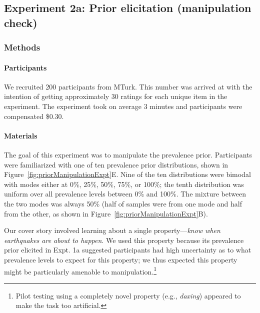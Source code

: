 \documentclass[floatsintext,doc]{apa6}
\let\oldparagraph\paragraph
\renewcommand{\paragraph}[1]{\oldparagraph{#1}\mbox{}}
\let\rmarkdownfootnote\footnote%
\def\footnote{\protect\rmarkdownfootnote}
\begin{document}
\hypertarget{experiment-2a-prior-elicitation-manipulation-check}{%
\subsection{Experiment 2a: Prior elicitation (manipulation check)}\label{experiment-2a-prior-elicitation-manipulation-check}}

\hypertarget{methods-2}{%
\subsubsection{Methods}\label{methods-2}}

\hypertarget{participants-3}{%
\paragraph{Participants}\label{participants-3}}

We recruited 200 participants from MTurk.
This number was arrived at with the intention of getting approximately 30 ratings for each unique item in the experiment.
The experiment took on average 3 minutes and participants were compensated \$0.30.

\hypertarget{materials-1}{%
\paragraph{Materials}\label{materials-1}}

The goal of this experiment was to manipulate the prevalence prior.
Participants were familiarized with one of ten prevalence prior distributions, shown in Figure~\ref{fig:priorManipulationExpt}E.
Nine of the ten distributions were bimodal with modes either at 0\%, 25\%, 50\%, 75\%, or 100\%; the tenth distribution was uniform over all prevalence levels between 0\% and 100\%.
The mixture between the two modes was always 50\% (half of samples were from one mode and half from the other, as shown in Figure~\ref{fig:priorManipulationExpt}B).

Our cover story involved learning about a single property---\emph{know when earthquakes are about to happen}.
We used this property because its prevalence prior elicited in Expt. 1a suggested participants had high uncertainty as to what prevalence levels to expect for this property; we thus expected this property might be particularly amenable to manipulation.\footnote{Pilot testing using a completely novel property (e.g., \emph{daxing}) appeared to make the task too artificial. }
\end{document}
